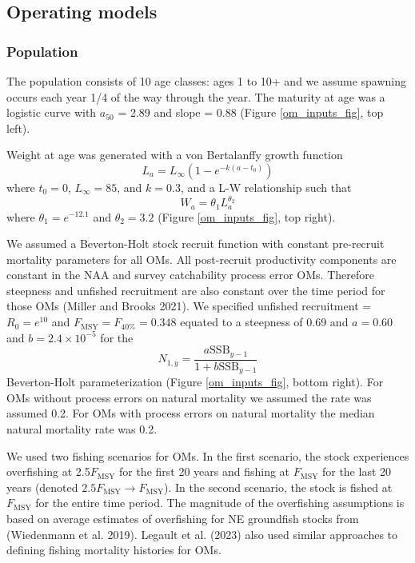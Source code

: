 \documentclass[
  12pt,
]{article}
\newcommand{\Fmsy}{\ensuremath{F_{\text{MSY}}}\xspace}
\begin{document}
\hypertarget{operating-models}{%
\subsection*{Operating models}\label{operating-models}}

\hypertarget{population}{%
\subsubsection*{Population}\label{population}}

The population consists of 10 age classes: ages 1 to 10+ and we assume
spawning occurs each year 1/4 of the way through the year. The maturity
at age was a logistic curve with \(a_{50}\) = 2.89 and slope = 0.88
(Figure \ref{om_inputs_fig}, top left).

Weight at age was generated with a von Bertalanffy growth function \[
L_a = L_{\infty}\left(1 - e^{-k(a - t_0)}\right)
\] where \(t_0 = 0\), \(L_\infty = 85\), and \(k = 0.3\), and a L-W
relationship such that \[
W_a = \theta_1 L_a^{\theta_2}
\] where \(\theta_1 = e^{-12.1}\) and \(\theta_2 = 3.2\) (Figure
\ref{om_inputs_fig}, top right).

We assumed a Beverton-Holt stock recruit function with constant
pre-recruit mortality parameters for all OMs. All post-recruit
productivity components are constant in the NAA and survey catchability
process error OMs. Therefore steepness and unfished recruitment are also
constant over the time period for those OMs (Miller and Brooks 2021). We
specified unfished recruitment = \(R_0 = e^{10}\) and
\(\Fmsy = F_{40\%} = 0.348\) equated to a steepness of 0.69 and
\(a=0.60\) and \(b = 2.4 \times 10^{-5}\) for the \[
N_{1,y} = \frac{a \text{SSB}_{y-1}}{1 + b \text{SSB}_{y-1}} 
\] Beverton-Holt parameterization (Figure \ref{om_inputs_fig}, bottom
right). For OMs without process errors on natural mortality we assumed
the rate was assumed 0.2. For OMs with process errors on natural
mortality the median natural mortality rate was 0.2.

We used two fishing scenarios for OMs. In the first scenario, the stock
experiences overfishing at 2.5\Fmsy for the first 20 years and fishing
at \Fmsy for the last 20 years (denoted \(2.5\Fmsy \rightarrow \Fmsy\)).
In the second scenario, the stock is fished at \Fmsy for the entire time
period. The magnitude of the overfishing assumptions is based on average
estimates of overfishing for NE groundfish stocks from (Wiedenmann et
al. 2019). Legault et al. (2023) also used similar approaches to
defining fishing mortality histories for OMs.
\end{document}
